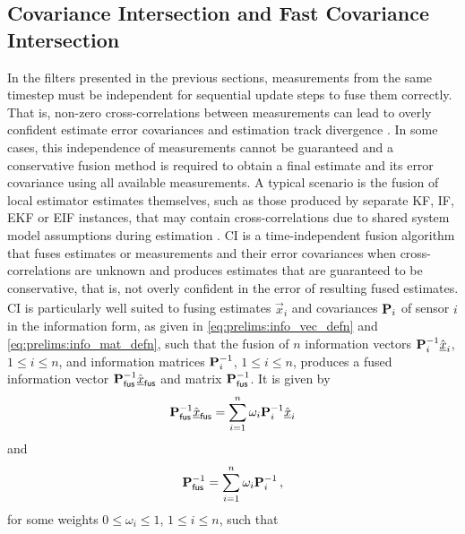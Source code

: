 \subsection{Covariance Intersection and Fast Covariance Intersection}\label{subsec:prelims:fci}
In the filters presented in the previous sections, measurements from the same timestep must be independent for sequential update steps to fuse them correctly. That is, non-zero cross-correlations between measurements can lead to overly confident estimate error covariances and estimation track divergence \cite{bar-shalomTracktotrackCorrelationProblem1981,sunMultisensorOptimalInformation2004}. In some cases, this independence of measurements cannot be guaranteed and a conservative fusion method is required to obtain a final estimate and its error covariance using all available measurements. A typical scenario is the fusion of local estimator estimates themselves, such as those produced by separate KF, IF, EKF or EIF instances, that may contain cross-correlations due to shared system model assumptions during estimation \cite{wangDistributedEstimationFusion2012,radtkeDistributedEstimationUsing2019,ajglInverseCovarianceIntersection2020}. CI is a time-independent fusion algorithm that fuses estimates or measurements and their error covariances when cross-correlations are unknown \cite{julierNondivergentEstimationAlgorithm1997} and produces estimates that are guaranteed to be conservative, that is, not overly confident in the error of resulting fused estimates. CI is particularly well suited to fusing estimates $\hat{\vec{x}}_i$ and covariances ${{\mathbf{P}}}_i$ of sensor $i$ in the information form, as given in \eqref{eq:prelims:info_vec_defn} and \eqref{eq:prelims:info_mat_defn}, such that the fusion of $n$ information vectors ${{\mathbf{P}}}_i^{-1}\hat{{\underline{x}}}_i$, $1\leq i\leq n$, and information matrices ${{\mathbf{P}}}_i^{-1}$, $1\leq i\leq n$, produces a fused information vector ${{\mathbf{P}}}_{\mathsf{fus}}^{-1}\hat{{\underline{x}}}_{\mathsf{fus}}$ and matrix ${{\mathbf{P}}}_{\mathsf{fus}}^{-1}$. It is given by
\begin{equation}\label{eq:prelims:ci_info_vec}
    {\ensuremath{{\mathbf{P}}}}_{\mathsf{fus}}^{-1}\hat{{\underline{x}}}_{\mathsf{fus}} = \sum_{i=1}^n \omega_i {{\mathbf{P}}}_i^{-1} \hat{{\underline{x}}}_i
\end{equation}
and
\begin{equation}\label{eq:prelims:ci_info_mat}
{\ensuremath{{\mathbf{P}}}}_{\mathsf{fus}}^{-1}=\sum_{i=1}^{n}\omega_i {{\mathbf{P}}}_i^{-1}\,,
\end{equation}
for some weights $0\leq \omega_i \leq 1$, $1\leq i \leq n$, such that
